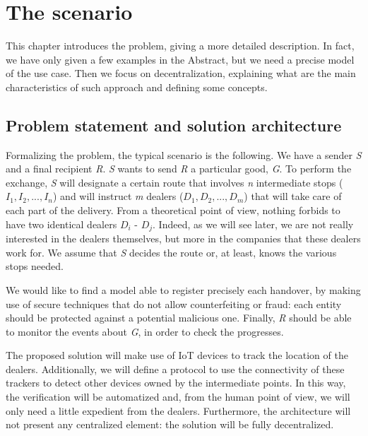 \chapter{The scenario}
\label{cha:scenario}

This chapter introduces the problem, giving a more detailed description. In fact, we have only given a few examples in the Abstract, but we need a precise model of the use case. Then we focus on decentralization, explaining what are the main characteristics of such approach and defining some concepts.

\section{Problem statement and solution architecture}
\label{sec:statement}
Formalizing the problem, the typical scenario is the following. We have a sender \textit{S} and a final recipient \textit{R}. \textit{S} wants to send \textit{R} a particular good, \textit{G}. To perform the exchange, \textit{S} will designate a certain route that involves \textit{n} intermediate stops ($I_1, I_2, ..., I_n$) and will instruct \textit{m} dealers ($D_1, D_2, ..., D_m$) that will take care of each part of the delivery. From a theoretical point of view, nothing forbids to have two identical dealers $D_i$ - $D_j$. Indeed, as we will see later, we are not really interested in the dealers themselves, but more in the companies that these dealers work for. We assume that \textit{S} decides the route or, at least, knows the various stops needed.

We would like to find a model able to register precisely each handover, by making use of secure techniques that do not allow counterfeiting or fraud: each entity should be protected against a potential malicious one. Finally, \textit{R} should be able to monitor the events about \textit{G}, in order to check the progresses.

The proposed solution will make use of IoT devices to track the location of the dealers. Additionally, we will define a protocol to use the connectivity of these trackers to detect other devices owned by the intermediate points. In this way, the verification will be automatized and, from the human point of view, we will only need a little expedient from the dealers. Furthermore, the architecture will not present any centralized element: the solution will be fully decentralized.

